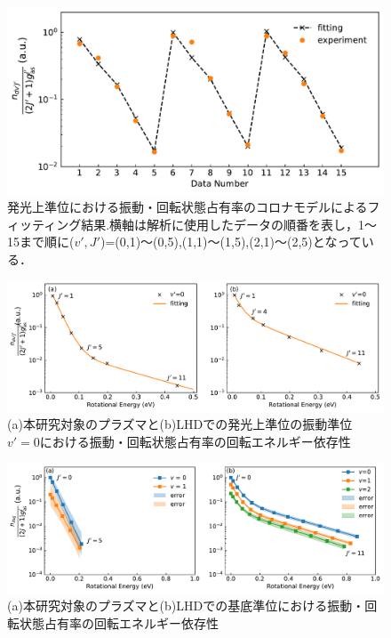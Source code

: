 \begin{figure}
    \centering
    \includegraphics[width=15cm]{pictures/fitting-result.pdf}
    \caption[発光上準位における振動・回転状態占有率のコロナモデルによるフィッティング結果]{発光上準位における振動・回転状態占有率のコロナモデルによるフィッティング結果.横軸は解析に使用したデータの順番を表し，1〜15まで順に($v',J'$)=(0,1)〜(0,5),(1,1)〜(1,5),(2,1)〜(2,5)となっている．}
    \label{fig:fitting-result}
\end{figure}

\begin{figure}
    \centering
    \includegraphics[width=15cm]{pictures/two-boltzmann-compare.pdf}
    \caption{(a)本研究対象のプラズマと(b)LHD\cite{ishihara}での発光上準位の振動準位$v'=0$における振動・回転状態占有率の回転エネルギー依存性}
    \label{fig:two-boltzmann-compare}
\end{figure}

\begin{figure}
    \centering
    \includegraphics[width=15cm]{pictures/ground-compare.pdf}
    \caption{(a)本研究対象のプラズマと(b)LHD\cite{ishihara}での基底準位における振動・回転状態占有率の回転エネルギー依存性}
    \label{fig:ground-compare}
\end{figure}
